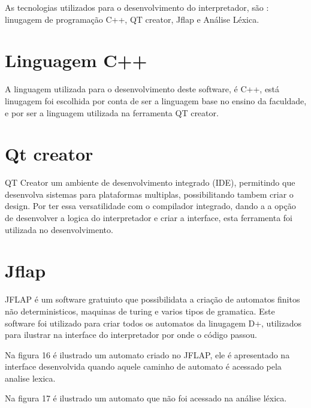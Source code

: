 \documentclass[12pt,oneside,a4paper,chapter=TITLE,section=TITLE,sumario=tradicional]{abntex2}
\begin{document}
As tecnologias utilizados para o desenvolvimento do interpretador, são : linugagem de programação C++, QT creator, Jflap e Análise Léxica.

\section{ Linguagem C++}
\label{sec:linugagemc++}

A linguagem utilizada para o desenvolvimento deste software, é C++, está linugagem foi escolhida por conta de ser a linguagem base no ensino da faculdade, e por ser a linguagem utilizada na ferramenta QT creator. 

\section{ Qt creator}
\label{sec:qtcreator}

QT Creator um ambiente de desenvolvimento integrado (IDE), permitindo que desenvolva sistemas para plataformas multiplas, possibilitando tambem criar o design. Por ter essa versatilidade com o compilador integrado, dando a a opção de desenvolver a logica do interpretador e criar a interface, esta ferramenta foi utilizada no desenvolvimento.

\section{Jflap}
\label{sec:jflap}

JFLAP é um software gratuiuto que possibilidata a criação de automatos finitos não deterministicos, maquinas de turing e varios tipos de gramatica. Este software foi utilizado para criar todos os automatos da linugagem D+, utilizados para ilustrar na interface do interpretador por onde o código passou.

Na figura 16 é ilustrado um automato criado no JFLAP, ele é apresentado na interface desenvolvida quando aquele caminho de automato é acessado pela analise lexica.

\begin{figure}[htb]
\end{figure} 

Na figura 17 é ilustrado um automato que não foi acessado na análise léxica.

\begin{figure}[htb]
\end{figure}
\end{document}
